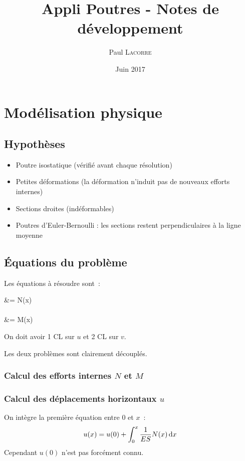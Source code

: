 \documentclass[draft]{report}
\title{Appli Poutres - Notes de développement}
\author{Paul \textsc{Lacorre}}
\date{Juin 2017}
\begin{document}
\maketitle

\tableofcontents


\chapter{Modélisation physique}

\section{Hypothèses}
\begin{itemize}
\item Poutre isostatique (vérifié avant chaque résolution)
\item Petites déformations (la déformation n'induit pas de nouveaux efforts internes)
\item Sections droites (indéformables)
\item Poutres d'Euler-Bernoulli : les sections restent perpendiculaires à la ligne moyenne 
\end{itemize}

\section{Équations du problème}

Les équations à résoudre sont~:
\begin{systeme}
 &=  N(x) \\
\\
 &=  M(x) \\
\end{systeme}
On doit avoir 1 CL sur $u$ et 2 CL sur $v$.

Les deux problèmes sont clairement découplés.

\subsection{Calcul des efforts internes $N$ et $M$}


\subsection{Calcul des déplacements horizontaux $u$}
On intègre la première équation entre $0$ et $x$~:
\[ u(x) = u(0) + \int_0^x \dfrac{1}{ES} N(x) \, \mathrm d x \]
Cependant $u(0)$ n'est pas forcément connu.
\end{document}
